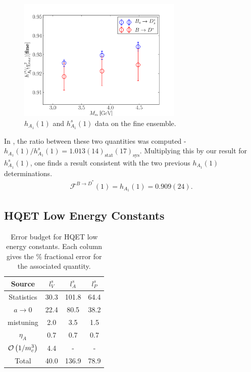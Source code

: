 \begin{figure}[htb!]
  \begin{center}
  \hspace{-10pt}
  \includegraphics[width=0.7\textwidth]{images/BsDsstar/BD_BsDs.pdf}
  \caption{$h_{A_1}(1)$ and $h_{A_1}^s(1)$ data on the fine ensemble.\label{fig:BD_BsDs}}
  \end{center}
\end{figure}

In \cite{Harrison:2017fmw}, the ratio between these two quantities was computed - $h_{A_1}(1) / h^s_{A_1}(1) = 1.013(14)_{\text{stat}}(17)_{\text{sys}}$. Multiplying this by our result for $h^s_{A_1}(1)$, one finds a result consistent with the two previous $h_{A_1}(1)$ determinations.
\begin{align}
  \mathcal{F}^{B\to D^*}(1) = h_{A_1}(1) = 0.909(24).
  \label{eq:hA1_us_nrqcd}
\end{align}

\subsection{HQET Low Energy Constants}

\begin{table}
  \begin{center}
    \begin{tabular}{c c c c}
      \hline
      Source & $l^s_V$ & $l^s_A$ & $l^s_P$ \\ [0.5ex]
      \hline
      Statistics & 30.3 & 101.8 & 64.4  \\ [1ex]
      $a\to 0$ & 22.4 & 80.5 & 38.2 \\ [1ex]
      mistuning & 2.0 & 3.5 & 1.5  \\ [1ex]
      $\eta_A$ & 0.7 & 0.7 & 0.7 \\ [1ex]
      $\mathcal{O}\left( 1/m_c^3 \right)$ & 4.4 & - & -\\ [1ex]
      \hline
      Total & 40.0 & 136.9 & 78.9  \\ [1ex]
      \hline
    \end{tabular}
  \end{center}
  \caption{Error budget for HQET low energy constants. Each column gives the \% fractional error for the associated quantity. \label{tab:HQETbudget}}
\end{table}

